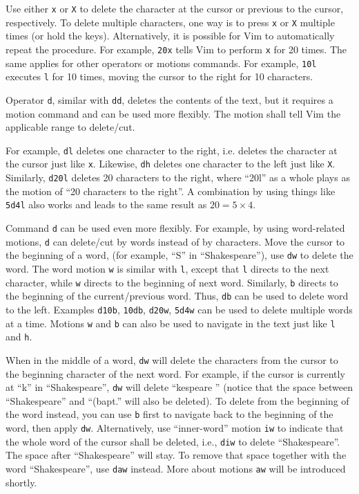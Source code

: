 Use either \verb|x| or \verb|X| to delete the character at the cursor or previous to the cursor, respectively. To delete multiple characters, one way is to press \verb|x| or \verb|X| multiple times (or hold the keys). Alternatively, it is possible for Vim to automatically repeat the procedure. For example, \verb|20x| tells Vim to perform \verb|x| for 20 times. The same applies for other operators or motions commands. For example, \verb|10l| executes \verb|l| for 10 times, moving the cursor to the right for 10 characters.

Operator \verb|d|, similar with \verb|dd|, deletes the contents of the text, but it requires a motion command and can be used more flexibly. The motion shall tell Vim the applicable range to delete/cut.

For example, \verb|dl| deletes one character to the right, i.e. deletes the character at the cursor just like \verb|x|. Likewise, \verb|dh| deletes one character to the left just like \verb|X|. Similarly, \verb|d20l| deletes 20 characters to the right, where ``20l'' as a whole plays as the motion of ``20 characters to the right''. A combination by using things like \verb|5d4l| also works and leads to the same result as $20=5\times 4$.

Command \verb|d| can be used even more flexibly. For example, by using word-related motions, \verb|d| can delete/cut by words instead of by characters. Move the cursor to the beginning of a word, (for example, ``S'' in ``Shakespeare''), use \verb|dw| to delete the word. The word motion \verb|w| is similar with \verb|l|, except that \verb|l| directs to the next character, while \verb|w| directs to the beginning of next word. Similarly, \verb|b| directs to the beginning of the current/previous word. Thus, \verb|db| can be used to delete word to the left. Examples \verb|d10b|, \verb|10db|, \verb|d20w|, \verb|5d4w| can be used to delete multiple words at a time. Motions \verb|w| and \verb|b| can also be used to navigate in the text just like \verb|l| and \verb|h|.

When in the middle of a word, \verb|dw| will delete the characters from the cursor to the beginning character of the next word. For example, if the cursor is currently at ``k'' in ``Shakespeare'', \verb|dw| will delete ``kespeare '' (notice that the space between ``Shakespeare'' and ``(bapt.'' will also be deleted). To delete from the beginning of the word instead, you can use \verb|b| first to navigate back to the beginning of the word, then apply \verb|dw|. Alternatively, use ``inner-word'' motion \verb|iw| to indicate that the whole word of the cursor shall be deleted, i.e., \verb|diw| to delete ``Shakespeare''. The space after ``Shakespeare'' will stay. To remove that space together with the word ``Shakespeare'', use \verb|daw| instead. More about motions \verb|aw| will be introduced shortly.

